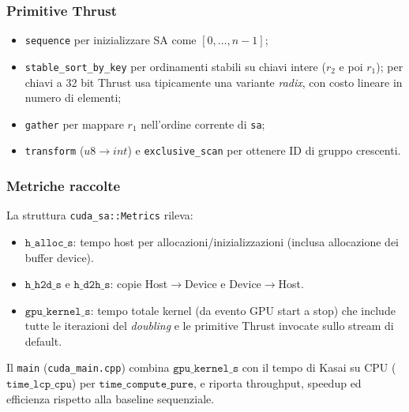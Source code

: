 			\subsubsection*{Primitive Thrust}
				\begin{itemize}
						\item \texttt{sequence} per inizializzare SA come \([0,\dots,n{-}1]\);
						\item \texttt{stable\_sort\_by\_key} per ordinamenti stabili su chiavi intere (\(r_2\) e poi \(r_1\)); per chiavi a 32 bit Thrust usa tipicamente una variante \emph{radix}, con costo lineare in numero di elementi;
						\item \texttt{gather} per mappare \(r_1\) nell'ordine corrente di \texttt{sa};
						\item \texttt{transform} (\(u8\to int\)) e \texttt{exclusive\_scan} per ottenere ID di gruppo crescenti.
				\end{itemize}
			
			\subsubsection*{Metriche raccolte}
				La struttura \texttt{cuda\_sa::Metrics} rileva:
				\begin{itemize}
						\item \(\texttt{h\_alloc\_s}\): tempo host per allocazioni/inizializzazioni (inclusa allocazione dei buffer device).
						\item \(\texttt{h\_h2d\_s}\) e \(\texttt{h\_d2h\_s}\): copie Host\(\to\)Device e Device\(\to\)Host.
						\item \(\texttt{gpu\_kernel\_s}\): tempo totale kernel (da evento GPU start a stop) che include tutte le iterazioni del \emph{doubling} e le primitive Thrust invocate sullo stream di default.
				\end{itemize}
				Il \texttt{main} (\texttt{cuda\_main.cpp}) combina \(\texttt{gpu\_kernel\_s}\) con il tempo di Kasai su CPU (\(\texttt{time\_lcp\_cpu}\)) per \(\texttt{time\_compute\_pure}\), e riporta throughput, speedup ed efficienza rispetto alla baseline sequenziale.
			
